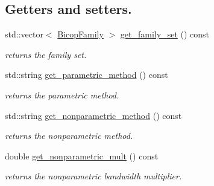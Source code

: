 \subsection*{Getters and setters.}
\begin{DoxyCompactItemize}
\item 
\mbox{\label{classvinecopulib_1_1_fit_controls_bicop_aa3958aa4fe5d2900a14db83224d256b2}} 
std\+::vector$<$ \hyperlink{namespacevinecopulib_a42e95cc06d33896199caab0c11ad44f3}{Bicop\+Family} $>$ \hyperlink{classvinecopulib_1_1_fit_controls_bicop_aa3958aa4fe5d2900a14db83224d256b2}{get\+\_\+family\+\_\+set} () const
\begin{DoxyCompactList}\small\item\em returns the family set. \end{DoxyCompactList}\item 
\mbox{\label{classvinecopulib_1_1_fit_controls_bicop_a5b10436f0fb84d8a3276a514c05c8442}} 
std\+::string \hyperlink{classvinecopulib_1_1_fit_controls_bicop_a5b10436f0fb84d8a3276a514c05c8442}{get\+\_\+parametric\+\_\+method} () const
\begin{DoxyCompactList}\small\item\em returns the parametric method. \end{DoxyCompactList}\item 
\mbox{\label{classvinecopulib_1_1_fit_controls_bicop_af1ff49b3f08edd0ae2986b10956d2067}} 
std\+::string \hyperlink{classvinecopulib_1_1_fit_controls_bicop_af1ff49b3f08edd0ae2986b10956d2067}{get\+\_\+nonparametric\+\_\+method} () const
\begin{DoxyCompactList}\small\item\em returns the nonparametric method. \end{DoxyCompactList}\item 
\mbox{\label{classvinecopulib_1_1_fit_controls_bicop_adb5099d2fad28099872abf75b4f6c7a1}} 
double \hyperlink{classvinecopulib_1_1_fit_controls_bicop_adb5099d2fad28099872abf75b4f6c7a1}{get\+\_\+nonparametric\+\_\+mult} () const
\begin{DoxyCompactList}\small\item\em returns the nonparametric bandwidth multiplier. \end{DoxyCompactList}\item 

\end{DoxyCompactItemize}
